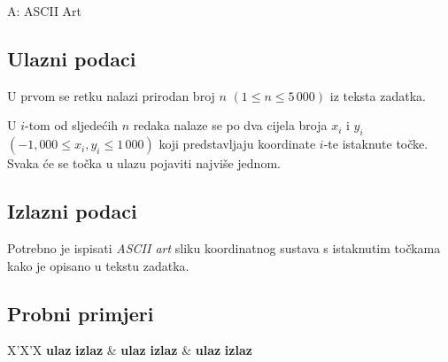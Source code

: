 \begin{statement}[
  timelimit=1 s,
  memorylimit=512 MiB,
]{A: ASCII Art}
\subsection*{Ulazni podaci}
  U prvom se retku nalazi prirodan broj $n$ $(1 \le n \le 5\,000)$ iz teksta
zadatka.

U $i$-tom od sljedećih $n$ redaka nalaze se po dva cijela broja $x_i$ i
$y_i$ $(-1,000 \le x_i, y_i \le 1\,000)$ koji predstavljaju koordinate $i$-te
istaknute točke. Svaka će se točka u ulazu pojaviti najviše jednom.

\subsection*{Izlazni podaci}
Potrebno je ispisati \textit{ASCII art} sliku koordinatnog sustava s
istaknutim točkama kako je opisano u tekstu zadatka.

\subsection*{Probni primjeri}
\begin{tabularx}{\textwidth}{X'X'X}
  \textbf{ulaz}
  \linespread{1}{}
  \textbf{izlaz}
  \linespread{1}{} &
  \textbf{ulaz}
  \linespread{1}{}
  \textbf{izlaz}
  \linespread{1}{} &
  \textbf{ulaz}
  \linespread{1}{}
  \textbf{izlaz}
  \linespread{1}{}
\end{tabularx}

\end{statement}

